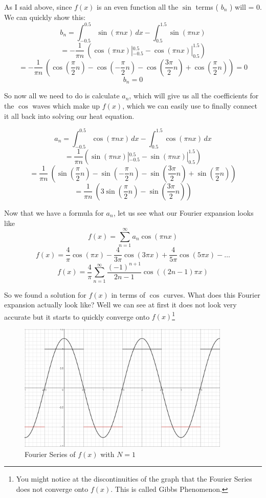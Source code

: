 \documentclass{report}
\begin{document}
As I said above, since $f(x)$ is an even function all the $\sin$ terms ( $b_n$ ) will = 0. We can quickly show this:
\[b_n = \int_{-0.5}^{0.5} \sin \left(\pi n x\right) \, dx - \int_{0.5}^{1.5} \sin \left(\pi n x\right)\]
\[= -\frac{1}{\pi n}\ \left( \cos(\pi n x) |_{-0.5}^{0.5} - \cos(\pi n x) |_{0.5}^{1.5}  \right) \]
\[= -\frac{1}{\pi n}\ \left( \cos( \frac{\pi}{2}n )  - \cos( -\frac{\pi}{2}n ) - \cos( \frac{3\pi}{2}n ) + \cos( \frac{\pi}{2}n ) \right) = 0\]
\[b_n = 0 \]

So now all we need to do is calculate $a_n$, which will give us all the coefficients for the $\cos$ waves which make up $f(x)$, which we can
easily use to finally connect it all back into solving our heat equation. 


\[
a_{n} = \int_{-0.5}^{0.5} \cos \left(\pi n x\right) \, dx - \int_{0.5}^{1.5} \cos \left(\pi n x\right) \, dx
\]
\[= \frac{1}{\pi n}\left( \sin(\pi n x) |_{-0.5}^{0.5} - \sin(\pi n x) |_{0.5}^{1.5}  \right)  \]
\[= \frac{1}{\pi n}\ \left( \sin( \frac{\pi}{2}n )  - \sin( -\frac{\pi}{2}n ) - \sin( \frac{3\pi}{2}n ) + \sin( \frac{\pi}{2}n ) \right)\]
\[= \frac{1}{\pi n}\ \left( 3\sin( \frac{\pi}{2}n )  - \sin( \frac{3\pi}{2}n ) \right)\]

Now that we have a formula for $a_n$, let us see what our Fourier expansion looks like
\[f(x) = \sum_{n=1}^{\infty} a_{n} \cos \left(\pi n x\right) \]
\[f(x) = \frac{4}{\pi}\cos(\pi x) - \frac{4}{3 \pi}\cos(3 \pi x) + \frac{4}{5\pi}\cos(5\pi x) - \dots \]
\[f(x) = \frac{4}{\pi}\sum_{n=1}^{\infty}\frac{\left(-1\right)^{n+1}}{2n-1}\cos\left(\left(2n-1\right)\pi x\right) \]

So we found a solution for $f(x)$ in terms of $\cos$ curves. What does this Fourier expansion actually look like?
Well we can see at first it does not look very accurate but it starts to quickly converge onto $f(x)$\footnote{You might notice at the discontinuities of the graph that the Fourier Series does not converge onto $f(x)$. This is called Gibbs Phenomenon.}

\begin{figure}[H]
    \centering
    \includegraphics[width=0.9\textwidth]{images/fourier_series/fourier_1.png}
    \caption{Fourier Series of $f(x)$ with $N=1$}
\end{figure}
\end{document}
